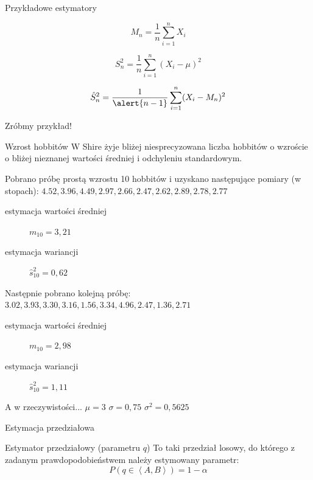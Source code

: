 \documentclass{mp}
\begin{document}
\begin{frame}{Przykładowe estymatory}
\begin{description}
\item<+->[wartości średniej (zgodność, wariancja, obciążenie, efektywność)] \[ M_n=\frac{1}{n}\sum_{i=1}^n X_i \]
\item<+->[wariancji gdy wartość średnia jest znana (zgodność, obciążenie)] \[ S^2_n=\frac{1}{n}\sum_{i=1}^n (X_i-\mu)^2 \]
\item<+->[nieobciążony wariancji gdy wartość średnia nie jest znana] \[ \hat{S}^2_n=\frac{1}{\alert{n-1}}\sum_{i=1}^n (X_i-M_n)^2 \]
\end{description}
\end{frame}

\begin{frame}{Zróbmy przykład!}
\begin{block}{Wzrost hobbitów}
W Shire żyje bliżej niesprecyzowana liczba hobbitów o wzroście o bliżej nieznanej wartości średniej i odchyleniu standardowym.

Pobrano próbę prostą wzrostu 10 hobbitów i uzyskano następujące pomiary (w stopach):
$4.52, 3.96, 4.49, 2.97, 2.66, 2.47, 2.62, 2.89, 2.78, 2.77$
\pause
\begin{description}
\item[estymacja wartości średniej] $m_{10}=3{,}21$
\item[estymacja wariancji] $\hat{s}^2_{10}=0{,}62$
\end{description}

\pause
Następnie pobrano kolejną próbę:
$3.02, 3.93, 3.30, 3.16, 1.56, 3.34, 4.96, 2.47, 1.36, 2.71$
\begin{description}
\item[estymacja wartości średniej] $m_{10}=2{,}98$
\item[estymacja wariancji] $\hat{s}^2_{10}=1{,}11$
\end{description}
\end{block}
\pause
A w rzeczywistości... $\mu=3\,\, \sigma=0{,}75\,\, \sigma^2=0{,}5625$
\end{frame}

\begin{frame}{Estymacja przedziałowa}
\begin{block}{Estymator przedziałowy (parametru $q$)}
To taki \alert{przedział losowy}, do którego z zadanym prawdopodobieństwem należy estymowany parametr:
\[ P(q\in\left<A,B\right>)=1-\alpha \]
\end{block}
\end{frame}
\end{document}
